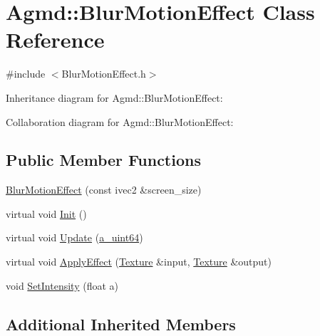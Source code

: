 \hypertarget{class_agmd_1_1_blur_motion_effect}{\section{Agmd\+:\+:Blur\+Motion\+Effect Class Reference}
\label{class_agmd_1_1_blur_motion_effect}
}


{\ttfamily \#include $<$Blur\+Motion\+Effect.\+h$>$}



Inheritance diagram for Agmd\+:\+:Blur\+Motion\+Effect\+:


Collaboration diagram for Agmd\+:\+:Blur\+Motion\+Effect\+:
\subsection*{Public Member Functions}
\begin{DoxyCompactItemize}
\item 
\hyperlink{class_agmd_1_1_blur_motion_effect_a54709bea123932d59d977bad8ff2a1dc}{Blur\+Motion\+Effect} (const ivec2 \&screen\+\_\+size)
\item 
virtual void \hyperlink{class_agmd_1_1_blur_motion_effect_a81459fa84cce7b8fb93c134a19217218}{Init} ()
\item 
virtual void \hyperlink{class_agmd_1_1_blur_motion_effect_ac94fcea7a83905333956f22f719c1805}{Update} (\hyperlink{_common_defines_8h_a6c5192ec3c55d6e5b13d2dbaa082bdea}{a\+\_\+uint64})
\item 
virtual void \hyperlink{class_agmd_1_1_blur_motion_effect_a6286d0c1aea5f9560fa0da698995addb}{Apply\+Effect} (\hyperlink{class_agmd_1_1_texture}{Texture} \&input, \hyperlink{class_agmd_1_1_texture}{Texture} \&output)
\item 
void \hyperlink{class_agmd_1_1_blur_motion_effect_ac695d37a19e536b7e24d9c41ca42730f}{Set\+Intensity} (float a)
\end{DoxyCompactItemize}
\subsection*{Additional Inherited Members}


